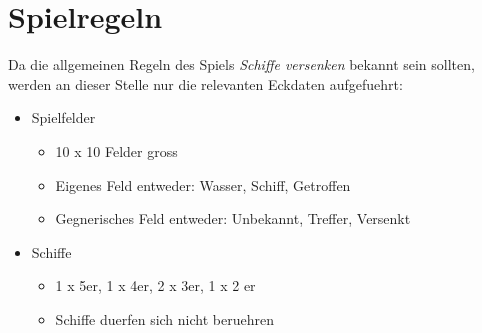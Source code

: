 \section{Spielregeln}
\label{sec:Spielregeln}

Da die allgemeinen Regeln des Spiels \textit{Schiffe versenken} bekannt sein sollten, werden an dieser Stelle nur die relevanten Eckdaten aufgefuehrt:


\begin{itemize}
	\item Spielfelder
		\begin{itemize}
			\item 10 x 10 Felder gross
			\item Eigenes Feld entweder: Wasser, Schiff, Getroffen
			\item Gegnerisches Feld entweder: Unbekannt, Treffer, Versenkt
		\end{itemize}
	\item Schiffe
		\begin{itemize}
			\item 1 x 5er, 1 x 4er, 2 x 3er, 1 x 2 er
			\item Schiffe duerfen sich nicht beruehren
		\end{itemize}
\end{itemize}